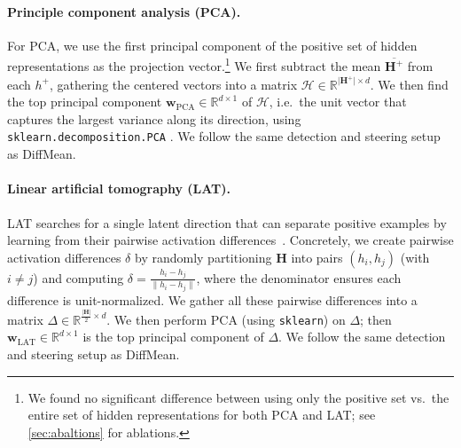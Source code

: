 \documentclass{article}
\theoremstyle{plain}
\theoremstyle{definition}
\theoremstyle{remark}
\renewcommand{\cite}{\citep}
\newcommand{\methodtag}[2]{%
  \tikz[baseline=(char.base)]{%
    \node[
      fill=#1,
      rounded corners=2pt,
      text=white,
      font=\bfseries,
      minimum width=1em,
      minimum height=1em,
      align=center,
      inner sep=0pt
    ](char){#2};%
  }%
}
\newcommand{\concepttag}{\protect\methodtag{conceptcolor}{C}}
\newcommand{\steeringtag}{\protect\methodtag{steeringcolor}{S}}
\begin{document}
\paragraph{\concepttag{}\steeringtag{} Principle component analysis (PCA).} For PCA, we use the first principal component of the positive set of hidden representations as the projection vector.\footnote{We found no significant difference between using only the positive set vs.~the entire set of hidden representations for both PCA and LAT; see \cref{sec:abaltions} for ablations.} We first subtract the mean $\overline{\mathbf{H}^+}$ from each \(h^+\), gathering the centered vectors into a matrix 
\(\mathcal{H}\in \mathbb{R}^{\vert\mathbf{H}^{+}\rvert\times d}\). We then find the top principal component 
\(\mathbf{w}_{\mathrm{PCA}} \in \mathbb{R}^{d \times 1}\) of \(\mathcal{H}\), i.e.~the unit vector that captures the largest variance along its direction, using \texttt{sklearn.decomposition.PCA} \cite{sklearn}. We follow the same detection and steering setup as DiffMean.

\paragraph{\concepttag{}\steeringtag{} Linear artificial tomography (LAT).} 
LAT searches for a single latent direction that can separate positive examples by 
learning from their pairwise activation differences~\cite{zou2023representationengineeringtopdownapproach}. Concretely, we create pairwise activation differences \(\delta\) by randomly partitioning \(\mathbf{H}\)
into pairs \((h_i, h_j)\) (with \(i \neq j\)) and computing
$
\delta = \frac{h_i-h_j}{\lVert h_i - h_j \rVert}
$,
where the denominator ensures each difference is unit-normalized. We gather all these pairwise differences into a matrix \(\Delta\in\mathbb{R}^{\frac{|\mathbf{H}|}{2}\times d}\). We then perform PCA (using \texttt{sklearn}) on \(\Delta\); then \(\mathbf{w}_{\text{LAT}} \in \mathbb{R}^{d \times 1}\) is the top principal component of \(\Delta\).  
We follow the same detection and steering setup as DiffMean.
\end{document}
